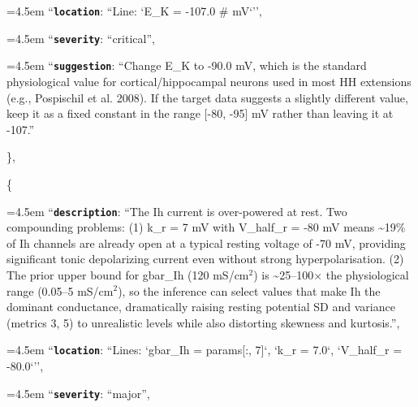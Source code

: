 \begin{tcolorbox}
\par\noindent\hangindent=4.5em \hspace*{3.0em}\hspace*{1.5em}``\textbf{\texttt{location}}\textquotesingle\textquotesingle: ``Line: `E\_K = -107.0  \# mV`'',
\par\noindent\hangindent=4.5em \hspace*{3.0em}\hspace*{1.5em}``\textbf{\texttt{severity}}\textquotesingle\textquotesingle: ``critical'',
\par\noindent\hangindent=4.5em \hspace*{3.0em}\hspace*{1.5em}``\textbf{\texttt{suggestion}}\textquotesingle\textquotesingle: ``Change E\_K to -90.0 mV, which is the standard physiological value for cortical/hippocampal neurons used in most HH extensions (e.g., Pospischil et al. 2008). If the target data suggests a slightly different value, keep it as a fixed constant in the range [-80, -95] mV rather than leaving it at -107.''
\par\noindent \hspace*{3.0em}\},
\par\noindent \hspace*{3.0em}\{
\par\noindent\hangindent=4.5em \hspace*{3.0em}\hspace*{1.5em}``\textbf{\texttt{description}}\textquotesingle\textquotesingle: ``The Ih current is over-powered at rest. Two compounding problems: (1) k\_r = 7 mV with V\_half\_r = -80 mV means \textasciitilde{}19\% of Ih channels are already open at a typical resting voltage of -70 mV, providing significant tonic depolarizing current even without strong hyperpolarisation. (2) The prior upper bound for gbar\_Ih (120 mS/cm$^{2}$) is \textasciitilde{}25--100$\times$ the physiological range (0.05--5 mS/cm$^{2}$), so the inference can select values that make Ih the dominant conductance, dramatically raising resting potential SD and variance (metrics 3, 5) to unrealistic levels while also distorting skewness and kurtosis.'',
\par\noindent\hangindent=4.5em \hspace*{3.0em}\hspace*{1.5em}``\textbf{\texttt{location}}\textquotesingle\textquotesingle: ``Lines: `gbar\_Ih = params[:, 7]`, `k\_r = 7.0`, `V\_half\_r = -80.0`'',
\par\noindent\hangindent=4.5em \hspace*{3.0em}\hspace*{1.5em}``\textbf{\texttt{severity}}\textquotesingle\textquotesingle: ``major'',

\end{tcolorbox}
